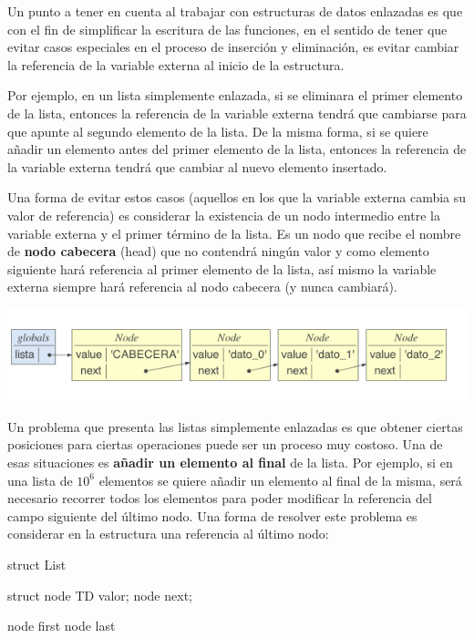 Un punto a tener en cuenta al trabajar con estructuras de datos enlazadas es que con el fin de simplificar la escritura de las funciones, en el sentido de tener que evitar casos especiales en el proceso de inserción y eliminación, es evitar cambiar la referencia de la variable externa al inicio de la estructura. 

Por ejemplo, en un lista simplemente enlazada, si se eliminara el primer elemento de la lista, entonces la referencia de la variable externa tendrá que cambiarse para que apunte al segundo elemento de la lista. De la misma forma, si se quiere añadir un elemento antes del primer elemento de la lista, entonces la referencia de la variable externa tendrá que cambiar al nuevo elemento insertado. 

Una forma de evitar estos casos (aquellos en los que la variable externa cambia su valor de referencia) es considerar la existencia de un nodo intermedio entre la variable externa y el primer término de la lista. Es un nodo que recibe el nombre de \textbf{nodo cabecera} (head) que no contendrá ningún valor y como elemento siguiente hará referencia al primer elemento de la lista, así mismo la variable externa siempre hará referencia al nodo cabecera (y nunca cambiará).

\centerline{\includegraphics[width=.65\textwidth]{input/05-List-fig/ejemListaSingleLinkedConCabecera}}


Un problema que presenta las listas simplemente enlazadas es que obtener ciertas posiciones para ciertas operaciones puede ser un proceso muy costoso. 
Una de esas situaciones es \textbf{añadir un elemento al final} de la lista. Por ejemplo, si en una lista de $10^6$ elementos se quiere añadir un elemento al final de la misma, será necesario recorrer todos los elementos para poder modificar la referencia del campo siguiente del último nodo. Una forma de resolver este problema es considerar en la estructura una referencia al último nodo:

\hfil
\begin{minipage}{.2\textwidth}
\begin{pyverbatim}[][frame=single]
struct List {
  struct node {
    TD valor;
    node next;
  }
  
  node first
  node last
}
\end{pyverbatim}
\end{minipage}

